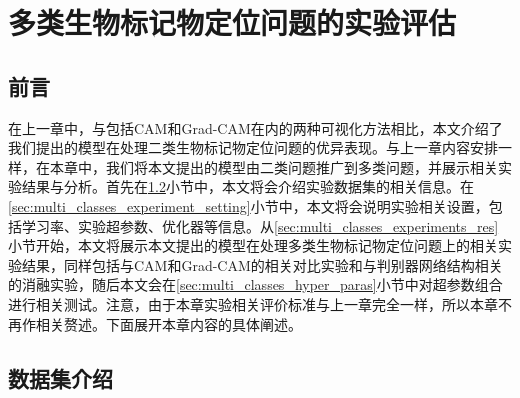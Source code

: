 \chapter{多类生物标记物定位问题的实验评估}\label{sec:multi_classes}
\section{前言}
在上一章中，与包括CAM和Grad-CAM在内的两种可视化方法相比，本文介绍了我们提出的模型在处理二类生物标记物定位问题的优异表现。与上一章内容安排一样，在本章中，我们将本文提出的模型由二类问题推广到多类问题，并展示相关实验结果与分析。首先在\ref{sec:mul_classes_ds_intro}小节中，本文将会介绍实验数据集的相关信息。在\ref{sec:multi_classes_experiment_setting}小节中，本文将会说明实验相关设置，包括学习率、实验超参数、优化器等信息。从\ref{sec:multi_classes_experiments_res}小节开始，本文将展示本文提出的模型在处理多类生物标记物定位问题上的相关实验结果，同样包括与CAM和Grad-CAM的相关对比实验和与判别器网络结构相关的消融实验，随后本文会在\ref{sec:multi_classes_hyper_paras}小节中对超参数组合进行相关测试。注意，由于本章实验相关评价标准与上一章完全一样，所以本章不再作相关赘述。下面展开本章内容的具体阐述。
\section{数据集介绍}\label{sec:mul_classes_ds_intro}
